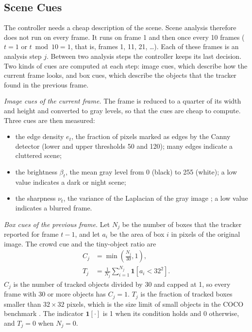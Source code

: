\subsection{Scene Cues}\label{sec:ac-cues}
The controller needs a cheap description of the scene. Scene analysis therefore does not run on every frame. It runs on frame 1 and then once every 10 frames ($t=1$ or $t \bmod 10 = 1$, that is, frames 1, 11, 21, \dots). Each of these frames is an analysis step $j$. Between two analysis steps the controller keeps its last decision. Two kinds of cues are computed at each step: image cues, which describe how the current frame looks, and box cues, which describe the objects that the tracker found in the previous frame.

\emph{Image cues of the current frame.} The frame is reduced to a quarter of its width and height and converted to gray levels, so that the cues are cheap to compute. Three cues are then measured:
\begin{itemize}
\item the edge density $e_t$, the fraction of pixels marked as edges by the Canny detector (lower and upper thresholds 50 and 120); many edges indicate a cluttered scene;
\item the brightness $\beta_t$, the mean gray level from 0 (black) to 255 (white); a low value indicates a dark or night scene;
\item the sharpness $\nu_t$, the variance of the Laplacian of the gray image \cite{pechpacheco2000blur}; a low value indicates a blurred frame.
\end{itemize}

\emph{Box cues of the previous frame.} Let $N_j$ be the number of boxes that the tracker reported for frame $t-1$, and let $a_i$ be the area of box $i$ in pixels of the original image. The crowd cue and the tiny-object ratio are
\begin{align}
C_j&=\min\!\left(\frac{N_j}{30},1\right),\label{eq:ac-crowd}\\
T_j&=\frac{1}{N_j}\sum_{i=1}^{N_j}\mathbf{1}\!\left[a_i<32^2\right].\label{eq:ac-tiny}
\end{align}
$C_j$ is the number of tracked objects divided by 30 and capped at 1, so every frame with 30 or more objects has $C_j=1$. $T_j$ is the fraction of tracked boxes smaller than $32\times32$ pixels, which is the size limit of small objects in the COCO benchmark \cite{lin2014coco}. The indicator $\mathbf{1}[\cdot]$ is 1 when its condition holds and 0 otherwise, and $T_j=0$ when $N_j=0$.

